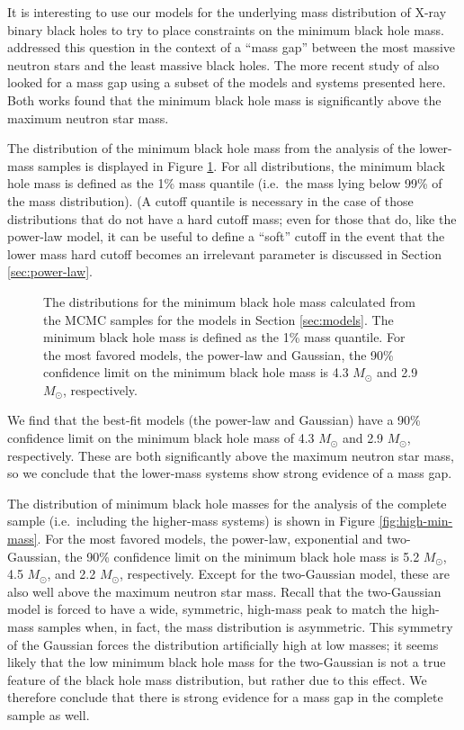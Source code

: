 \documentclass[preprint]{aastex}
\newcommand{\Msun}{M_\odot}
\begin{document}
It is interesting to use our models for the underlying mass
distribution of X-ray binary black holes to try to place constraints
on the minimum black hole mass.  \citet{Bailyn1998} addressed this
question in the context of a ``mass gap'' between the most massive
neutron stars and the least massive black holes.  The more recent
study of \citet{Ozel2010} also looked for a mass gap using a subset of
the models and systems presented here.  Both works found that the
minimum black hole mass is significantly above the maximum neutron
star mass.  

The distribution of the minimum black hole mass from the analysis of
the lower-mass samples is displayed in Figure \ref{fig:min-mass}.  For
all distributions, the minimum black hole mass is defined as the 1\%
mass quantile (i.e.\ the mass lying below 99\% of the mass
distribution).  (A cutoff quantile is necessary in the case of those
distributions that do not have a hard cutoff mass; even for those that
do, like the power-law model, it can be useful to define a ``soft''
cutoff in the event that the lower mass hard cutoff becomes an
irrelevant parameter is discussed in Section \ref{sec:power-law}.

\begin{figure}
  \begin{center}
  \end{center}
  \caption{\label{fig:min-mass} The distributions for the minimum
    black hole mass calculated from the MCMC samples for the models in
    Section \ref{sec:models}.  The minimum black hole mass is defined
    as the 1\% mass quantile.  For the most favored models, the
    power-law and Gaussian, the 90\% confidence limit on the minimum
    black hole mass is 4.3 $\Msun$ and 2.9 $\Msun$, respectively.}
\end{figure}

We find that the best-fit models (the power-law and Gaussian) have a
90\% confidence limit on the minimum black hole mass of 4.3 $\Msun$
and 2.9 $\Msun$, respectively.  These are both significantly above the
maximum neutron star mass, so we conclude that the lower-mass systems
show strong evidence of a mass gap.

The distribution of minimum black hole masses for the analysis of the
complete sample (i.e.\ including the higher-mass systems) is shown in
Figure \ref{fig:high-min-mass}.  For the most favored models, the
power-law, exponential and two-Gaussian, the 90\% confidence limit on
the minimum black hole mass is 5.2 $\Msun$, 4.5 $\Msun$, and 2.2
$\Msun$, respectively.  Except for the two-Gaussian model, these are
also well above the maximum neutron star mass.  Recall that the
two-Gaussian model is forced to have a wide, symmetric, high-mass peak
to match the high-mass samples when, in fact, the mass distribution is
asymmetric.  This symmetry of the Gaussian forces the distribution
artificially high at low masses; it seems likely that the low minimum
black hole mass for the two-Gaussian is not a true feature of the
black hole mass distribution, but rather due to this effect.  We
therefore conclude that there is strong evidence for a mass gap in the
complete sample as well.  
\end{document}
